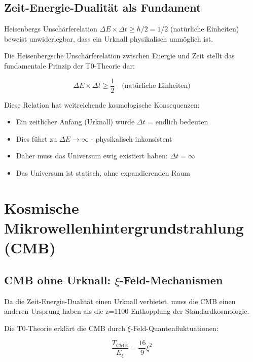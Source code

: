 \documentclass[12pt,a4paper]{article}
\begin{document}
	\subsection{Zeit-Energie-Dualität als Fundament}
	
	\begin{revolutionary}
		Heisenbergs Unschärferelation $\Delta E \times \Delta t \geq \hbar/2 = 1/2$ (natürliche Einheiten) beweist unwiderlegbar, dass ein Urknall physikalisch unmöglich ist.
	\end{revolutionary}
	
	Die Heisenbergsche Unschärferelation zwischen Energie und Zeit stellt das fundamentale Prinzip der T0-Theorie dar:
	
	\begin{equation}
		\Delta E \times \Delta t \geq \frac{1}{2} \quad \text{(natürliche Einheiten)}
	\end{equation}
	
	Diese Relation hat weitreichende kosmologische Konsequenzen:
	\begin{itemize}
		\item Ein zeitlicher Anfang (Urknall) würde $\Delta t$ = endlich bedeuten
		\item Dies führt zu $\Delta E \to \infty$ - physikalisch inkonsistent
		\item Daher muss das Universum ewig existiert haben: $\Delta t = \infty$
		\item Das Universum ist statisch, ohne expandierenden Raum
	\end{itemize}
	

	\section{Kosmische Mikrowellenhintergrundstrahlung (CMB)}
	
	\subsection{CMB ohne Urknall: $\xi$-Feld-Mechanismen}
	
	\begin{revolutionary}
		Da die Zeit-Energie-Dualität einen Urknall verbietet, muss die CMB einen anderen Ursprung haben als die z=1100-Entkopplung der Standardkosmologie.
	\end{revolutionary}
	
	Die T0-Theorie erklärt die CMB durch $\xi$-Feld-Quantenfluktuationen:
	
	\begin{equation}
		\frac{T_{\text{CMB}}}{E_\xi} = \frac{16}{9} \xi^2
	\end{equation}
	
\end{document}

